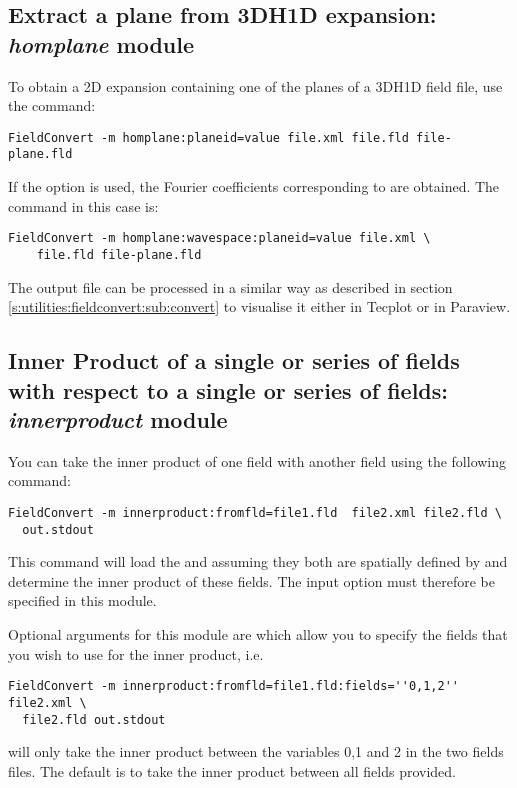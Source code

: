 \subsection{Extract a plane from 3DH1D expansion: \textit{homplane} module}

To obtain a 2D expansion containing one of the planes of a
3DH1D field file, use the command:
\begin{lstlisting}[style=BashInputStyle] 
FieldConvert -m homplane:planeid=value file.xml file.fld file-plane.fld
\end{lstlisting}

If the option  is used, the Fourier coefficients
corresponding to  are obtained. The command in this case is:
\begin{lstlisting}[style=BashInputStyle] 
FieldConvert -m homplane:wavespace:planeid=value file.xml \
    file.fld file-plane.fld
\end{lstlisting}

The output file  can be processed in a similar 
way as described in section \ref{s:utilities:fieldconvert:sub:convert}
to visualise it either in Tecplot or in Paraview.


\subsection{Inner Product of a single or series of fields with respect to a single or series of fields: \textit{innerproduct} module}
You can take the inner product of one field with another field using
the following command:
\begin{lstlisting}[style=BashInputStyle]
  FieldConvert -m innerproduct:fromfld=file1.fld  file2.xml file2.fld \
  out.stdout
\end{lstlisting}
This command will load the  and 
assuming they both are spatially defined by  and
determine the inner product of these fields. The input option
\inltt{fromfld} must therefore be specified in this module.

Optional arguments for this module are  which allow you to specify
the fields that you wish to use for the inner product, i.e. 
\begin{lstlisting}[style=BashInputStyle]
  FieldConvert -m innerproduct:fromfld=file1.fld:fields=''0,1,2'' file2.xml \
  file2.fld out.stdout
\end{lstlisting}
will only take the inner product between the variables 0,1 and 2 in
the two fields files. The default is to take the inner product between
all fields provided.

